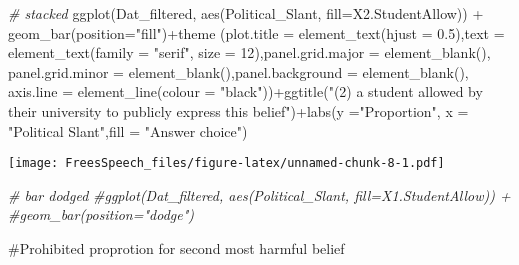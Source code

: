 \documentclass[
]{article}
\newenvironment{Shaded}{\begin{snugshade}}{\end{snugshade}}
\newcommand{\AttributeTok}[1]{\textcolor[rgb]{0.77,0.63,0.00}{#1}}
\newcommand{\CommentTok}[1]{\textcolor[rgb]{0.56,0.35,0.01}{\textit{#1}}}
\newcommand{\DecValTok}[1]{\textcolor[rgb]{0.00,0.00,0.81}{#1}}
\newcommand{\FloatTok}[1]{\textcolor[rgb]{0.00,0.00,0.81}{#1}}
\newcommand{\FunctionTok}[1]{\textcolor[rgb]{0.00,0.00,0.00}{#1}}
\newcommand{\NormalTok}[1]{#1}
\newcommand{\SpecialCharTok}[1]{\textcolor[rgb]{0.00,0.00,0.00}{#1}}
\newcommand{\StringTok}[1]{\textcolor[rgb]{0.31,0.60,0.02}{#1}}
\begin{document}
\begin{Shaded}
\begin{Highlighting}[]
\CommentTok{\# stacked}
\FunctionTok{ggplot}\NormalTok{(Dat\_filtered, }\FunctionTok{aes}\NormalTok{(Political\_Slant, }\AttributeTok{fill=}\NormalTok{X2.StudentAllow)) }\SpecialCharTok{+} 
  \FunctionTok{geom\_bar}\NormalTok{(}\AttributeTok{position=}\StringTok{"fill"}\NormalTok{)}\SpecialCharTok{+}\FunctionTok{theme}\NormalTok{ (}\AttributeTok{plot.title =} \FunctionTok{element\_text}\NormalTok{(}\AttributeTok{hjust =} \FloatTok{0.5}\NormalTok{),}\AttributeTok{text =} \FunctionTok{element\_text}\NormalTok{(}\AttributeTok{family =} \StringTok{"serif"}\NormalTok{, }\AttributeTok{size =} \DecValTok{12}\NormalTok{),}\AttributeTok{panel.grid.major =} \FunctionTok{element\_blank}\NormalTok{(), }\AttributeTok{panel.grid.minor =} \FunctionTok{element\_blank}\NormalTok{(),}\AttributeTok{panel.background =} \FunctionTok{element\_blank}\NormalTok{(), }\AttributeTok{axis.line =} \FunctionTok{element\_line}\NormalTok{(}\AttributeTok{colour =} \StringTok{"black"}\NormalTok{))}\SpecialCharTok{+}\FunctionTok{ggtitle}\NormalTok{(}\StringTok{"(2) a student allowed by their university to publicly express this belief"}\NormalTok{)}\SpecialCharTok{+}\FunctionTok{labs}\NormalTok{(}\AttributeTok{y =}\StringTok{"Proportion"}\NormalTok{, }\AttributeTok{x =} \StringTok{"Political Slant"}\NormalTok{,}\AttributeTok{fill =} \StringTok{"Answer choice"}\NormalTok{)}
\end{Highlighting}
\end{Shaded}

\texttt{[image: FreesSpeech\_files/figure-latex/unnamed-chunk-8-1.pdf]}

\begin{Shaded}
\begin{Highlighting}[]
\CommentTok{\# bar dodged}
\CommentTok{\#ggplot(Dat\_filtered, aes(Political\_Slant, fill=X1.StudentAllow)) + }
  \CommentTok{\#geom\_bar(position="dodge")}
\end{Highlighting}
\end{Shaded}

\#Prohibited proprotion for second most harmful belief
\end{document}
